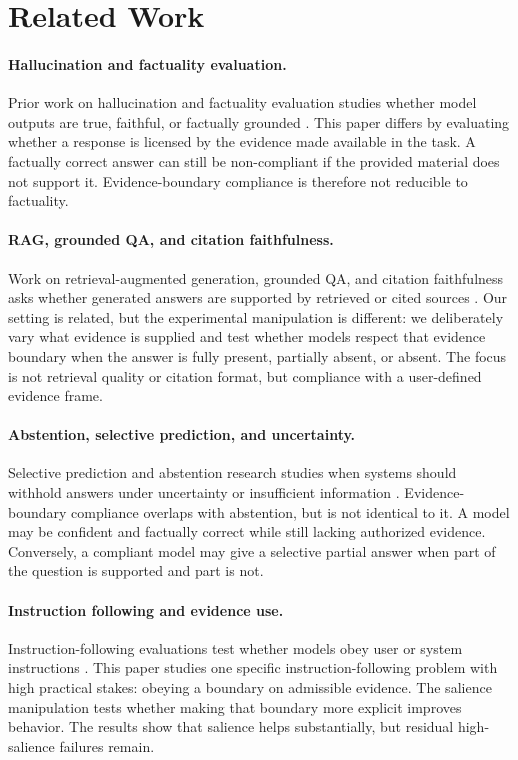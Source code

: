 \documentclass[11pt]{article}
\begin{document}
\section{Related Work}

\paragraph{Hallucination and factuality evaluation.}
Prior work on hallucination and factuality evaluation studies whether model outputs are true, faithful, or factually grounded \citep{TODO-hallucination-survey,TODO-factuality-evaluation}. This paper differs by evaluating whether a response is licensed by the evidence made available in the task. A factually correct answer can still be non-compliant if the provided material does not support it. Evidence-boundary compliance is therefore not reducible to factuality.

\paragraph{RAG, grounded QA, and citation faithfulness.}
Work on retrieval-augmented generation, grounded QA, and citation faithfulness asks whether generated answers are supported by retrieved or cited sources \citep{TODO-rag-evaluation,TODO-grounded-qa,TODO-citation-faithfulness}. Our setting is related, but the experimental manipulation is different: we deliberately vary what evidence is supplied and test whether models respect that evidence boundary when the answer is fully present, partially absent, or absent. The focus is not retrieval quality or citation format, but compliance with a user-defined evidence frame.

\paragraph{Abstention, selective prediction, and uncertainty.}
Selective prediction and abstention research studies when systems should withhold answers under uncertainty or insufficient information \citep{TODO-selective-prediction,TODO-abstention-llms}. Evidence-boundary compliance overlaps with abstention, but is not identical to it. A model may be confident and factually correct while still lacking authorized evidence. Conversely, a compliant model may give a selective partial answer when part of the question is supported and part is not.

\paragraph{Instruction following and evidence use.}
Instruction-following evaluations test whether models obey user or system instructions \citep{TODO-instruction-following}. This paper studies one specific instruction-following problem with high practical stakes: obeying a boundary on admissible evidence. The salience manipulation tests whether making that boundary more explicit improves behavior. The results show that salience helps substantially, but residual high-salience failures remain.
\end{document}
